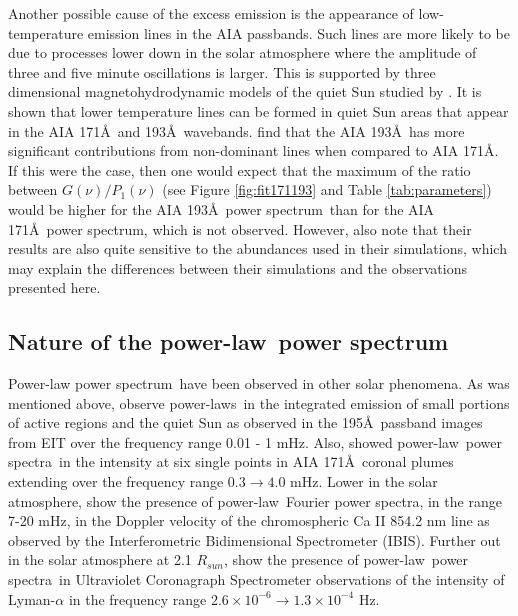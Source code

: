 \documentclass[onecolumn]{emulateapj}
\newcommand{\PS}{power spectrum}
\newcommand{\PA}{power spectra}
\newcommand{\PL}{power-law}
\newcommand{\PLs}{power-laws}
\newcommand{\BF}{ }
\begin{document}
Another possible cause of the excess emission is the appearance of
low-temperature emission lines in the AIA passbands.  Such lines are
more likely to be due to processes lower down in the solar atmosphere
where the amplitude of three and five minute oscillations is larger.
This is supported by three dimensional magnetohydrodynamic models of
the quiet Sun studied by \cite{2011ApJ...743...23M}.  It is shown that
lower temperature lines can be formed in quiet Sun areas that appear
in the AIA 171\AA\ and 193\AA\ wavebands. \cite{2011ApJ...743...23M}
find that the AIA 193\AA\ has more significant contributions from
non-dominant lines when compared to AIA 171\AA.  If this were the
case, then one would expect that the maximum of the ratio between
$G(\nu)/P_{1}(\nu)$ (see Figure \ref{fig:fit171193} and Table
\ref{tab:parameters}) would be higher for the AIA 193\AA\ \PS\ than
for the AIA 171\AA\ \PS, which is not observed.  However,
\cite{2011ApJ...743...23M} also note that their results are also quite
sensitive to the abundances used in their simulations, which may
explain the differences between their simulations and the observations
presented here.

\subsection{Nature of the \protect\PL\ \protect\PS}\label{ssec:nplps}
{\BF Power-law \PS\ have been
  observed in other solar phenomena.  As was mentioned above,
  \cite{2014AA...563A...8A} observe \PLs\ in the integrated
  emission of small portions of active regions and the quiet Sun as
  observed in the 195\AA\ passband images from EIT over the frequency
  range 0.01 - 1 mHz. Also, \citet{gupta2014} showed \PL\ \PA\ in the
  intensity at six single points in AIA 171\AA\ coronal plumes extending
  over the frequency range $0.3\rightarrow 4.0$ mHz.  Lower in the
  solar atmosphere, \cite{2008ApJ...683L.207R} show the presence of
  \PL\ Fourier \PA, in the range 7-20 mHz, in the Doppler velocity of
  the chromospheric Ca II 854.2 nm line as observed by the
  Interferometric Bidimensional Spectrometer (IBIS).  Further out in
  the solar atmosphere at 2.1 $R_{sun}$, \cite{2008ApJ...677L.137B}
  show the presence of \PL\ \PA\ in Ultraviolet Coronagraph
  Spectrometer observations of the intensity of Lyman-$\alpha$ in the
  frequency range $2.6\times10^{-6}\rightarrow1.3\times10^{-4}$ Hz.}
\end{document}

